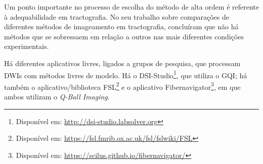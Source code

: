 \documentclass[
    12pt,                %
    oneside,            %
    a4paper,            %
    english,            %
    french,                %
    spanish,            %
    brazil                %
    ]{abntex2}
\begin{document}
Um ponto importante no processo de escolha do método de alta ordem é referente à adequabilidade em tractografia. No seu trabalho sobre comparações de diferentes métodos de imageamento em tractografia,  concluíram que não há métodos que se sobressaem em relação a outros nas mais diferentes condições experimentais.

Há diferentes aplicativos livres, ligados a grupos de pesquisa, que processam DWIs com métodos livres de modelo. Há o DSI-Studio\footnote{Disponível em: \url{http://dsi-studio.labsolver.org}}, que utiliza o GQI; há também o aplicativo/biblioteca FSL\footnote{Disponível em: \url{https://fsl.fmrib.ox.ac.uk/fsl/fslwiki/FSL}} e o aplicativo Fibernavigator\footnote{Disponível em: \url{https://scilus.github.io/fibernavigator/}}, em que ambos utilizam o \textit{Q-Ball Imaging}.















\end{document}
